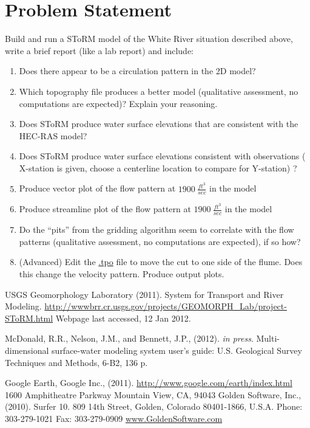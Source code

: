 \documentclass[12pt]{article}
\begin{document}
\section*{{Problem Statement}}
Build and run a SToRM model of the White River situation described above, write a brief report (like a lab report) and include:
\begin{enumerate}
\item Does there appear to be a circulation pattern in the 2D model?
\item Which topography file produces a better model (qualitative assessment, no computations are expected)? Explain your reasoning.
\item Does SToRM produce water surface elevations that are consistent with the HEC-RAS model?
\item Does SToRM produce water surface elevations consistent with observations ( X-station is given, choose a centerline location to compare for Y-station) ?
\item Produce vector plot of the flow pattern at $1900~\frac{ft^3}{sec}$ in the model
\item Produce streamline plot of the flow pattern at $1900~\frac{ft^3}{sec}$ in the model
\item Do the ``pits'' from the gridding algorithm seem to correlate with the flow patterns (qualitative assessment, no computations are expected), if so how?
\item (Advanced) Edit the \url{.tpo} file to move the cut to one side of the flume.  Does this change the velocity pattern.  Produce output plots.
\end{enumerate}


\begin{thebibliography}{}

{USGS Geomorphology Laboratory} (2011).
\newblock System for Transport and River Modeling.   
\url{http://wwwbrr.cr.usgs.gov/projects/GEOMORPH_Lab/project-SToRM.html} Webpage last accessed, 12 Jan 2012.

{McDonald, R.R., Nelson, J.M., and Bennett, J.P.}, (2012).  
\textsl{in press}. Multi-dimensional surface-water modeling system user's guide: U.S. Geological Survey Techniques and Methods, 6-B2, 136 p.

{Google Earth, Google Inc.}, (2011). 
\url{http://www.google.com/earth/index.html} 
1600 Amphitheatre Parkway Mountain View, CA, 94043
%
{Golden Software, Inc.}, (2010). Surfer 10.
809 14th Street, Golden, Colorado 80401-1866, U.S.A.
Phone: 303-279-1021 Fax: 303-279-0909
\url{www.GoldenSoftware.com}


\end{thebibliography}
\end{document}
